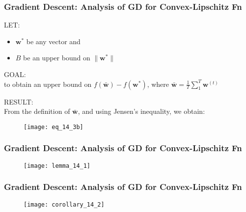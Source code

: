 \begin{frame}
\frametitle{Gradient Descent: Analysis of GD for Convex-Lipschitz Fn}

LET:
\begin{itemize}
\item $\mathbf{w^*}$ be any vector and
\item $B$ be an upper bound on $\parallel \mathbf{w^*} \parallel$
\end{itemize}
\vspace{3mm}

GOAL:\\
to obtain an upper bound on  $f(\bar{\mathbf{w}}) - f(\mathbf{w^*})$,
where $\bar{\mathbf{w}} = \frac{1}{T} \sum_{1}^{T} \mathbf{w}^{(t)}$
\vspace{3mm}

RESULT:\\
From the definition of $\bar{\mathbf{w}}$, and using Jensen's inequality, we obtain:
\begin{figure}
    \centering
    \texttt{[image: eq\_14\_3b]}
\end{figure}

\end{frame}

\begin{frame}
\frametitle{Gradient Descent: Analysis of GD for Convex-Lipschitz Fn}

\begin{figure}
    \centering
    \texttt{[image: lemma\_14\_1]}
\end{figure}

\end{frame}

\begin{frame}
\frametitle{Gradient Descent: Analysis of GD for Convex-Lipschitz Fn}

\begin{figure}
    \centering
    \texttt{[image: corollary\_14\_2]}
\end{figure}

\end{frame}
